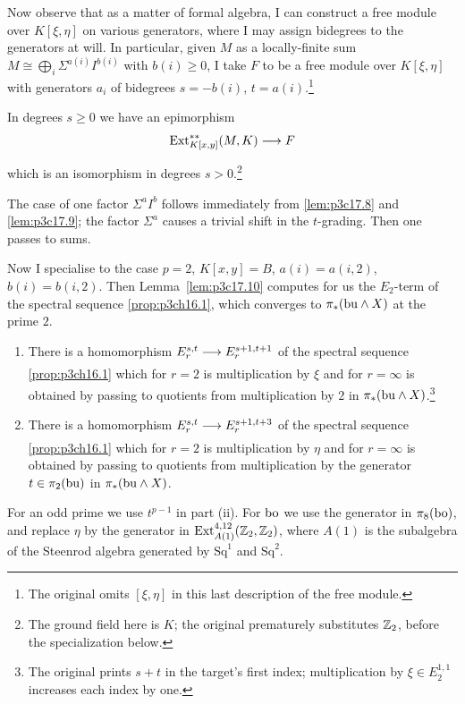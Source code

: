 \documentclass[../main]{subfiles}
\begin{document}
Now observe that as a matter of formal algebra, I can construct a free module over $K[\xi,\eta]$ on various generators, where I may assign bidegrees to the generators at will. In particular, given $M$ as a locally-finite sum $M\cong\bigoplus_i\Sigma^{a(i)}I^{b(i)}$ with $b(i)\ge0$, I take $F$ to be a free module over $K[\xi,\eta]$ with generators $a_i$ of bidegrees $s=-b(i)$, $t=a(i)$.\footnote{The original omits $[\xi,\eta]$ in this last description of the free module.}

\begin{lemma}
\label{lem:p3c17.10}
In degrees $s\ge0$ we have an epimorphism \[\mathrm{Ext}_{K[x,y]}^{\ast\ast}(M,K)\lar{}F\] which is an isomorphism in degrees $s>0$.\footnote{The ground field here is $K$; the original prematurely substitutes $\mathbb{Z}_2$, before the specialization below.}
\end{lemma}

The case of one factor $\Sigma^a I^b$ follows immediately from \ref{lem:p3c17.8} and \ref{lem:p3c17.9}; the factor $\Sigma^a$ causes a trivial shift in the $t$-grading. Then one passes to sums.

Now I specialise to the case $p = 2$, $K[x, y] = B$, $a(i) = a(i, 2)$, $b(i) = b(i, 2)$. Then Lemma~\ref{lem:p3c17.10} computes for us the $E_2$-term of the spectral sequence \ref{prop:p3ch16.1}, which converges to $\pi_\ast(\mathrm{bu} \wedge X)$ at the prime $2$. 

\begin{lemma}
\label{lem:p3c17.11}
\begin{enumerate}
    \item[(i)] There is a homomorphism $E_r^{s,t}\lar{}E_r^{s+1,t+1}$ of the spectral sequence \ref{prop:p3ch16.1} which for $r=2$ is multiplication by $\xi$ and for $r=\infty$ is obtained by passing to quotients from multiplication by $2$ in $\pi_\ast(\mathrm{bu}\wedge X)$.\footnote{The original prints $s+t$ in the target's first index; multiplication by $\xi\in E_2^{1,1}$ increases each index by one.}
    \item[(ii)] There is a homomorphism $E_r^{s, t} \lar{} E_r^{s + 1, t + 3}$ of the spectral sequence \ref{prop:p3ch16.1} which for $r = 2$ is multiplication by $\eta$ and for $r = \infty$ is obtained by passing to quotients from multiplication by the generator $t \in \pi_2(\mathrm{bu})$ in $\pi_\ast(\mathrm{bu} \wedge X)$.
\end{enumerate}
\end{lemma}

For an odd prime we use $t^{p-1}$ in part (ii). For $\mathrm{bo}$ we use the generator in $\pi_8(\mathrm{bo})$, and replace $\eta$ by the generator in $\mathrm{Ext}_{A(1)}^{4,12}(\mathbb{Z}_2,\mathbb{Z}_2)$, where $A(1)$ is the subalgebra of the Steenrod algebra generated by $\mathrm{Sq}^1$ and $\mathrm{Sq}^2$.
\end{document}
